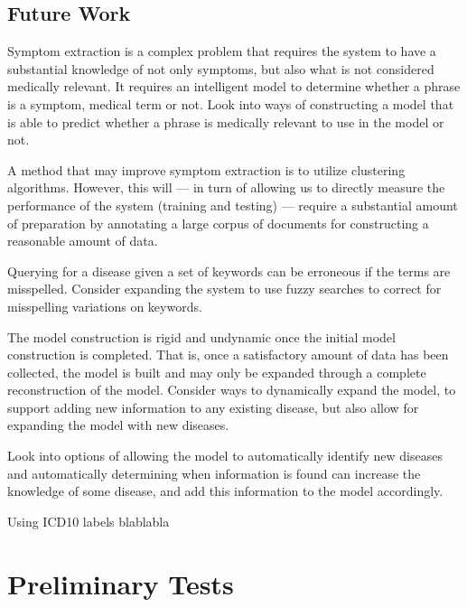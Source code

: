 \documentclass[10pt,letterpaper,final]{article}
\begin{document}




\subsection{Future Work}
Symptom extraction is a complex problem that requires the system to have
a substantial knowledge of not only symptoms, but also what is not
considered medically relevant. It requires an intelligent model to
determine whether a phrase is a symptom, medical term or not. Look into
ways of constructing a model that is able to predict whether a phrase
is medically relevant to use in the model or not.

A method that may improve symptom extraction is to utilize clustering
algorithms. However, this will --- in turn of allowing us to directly measure the
performance of the system (training and testing) --- require a substantial
amount of preparation by annotating a large corpus of documents for
constructing a reasonable amount of data.

Querying for a disease given a set of keywords can be erroneous if the
terms are misspelled. Consider expanding the system to use fuzzy
searches to correct for misspelling variations on keywords.

The model construction is rigid and undynamic once the initial model
construction is completed. That is, once a satisfactory amount of data
has been collected, the model is built and may only be expanded through
a complete reconstruction of the model. Consider ways to dynamically
expand the model, to support adding new information to any existing
disease, but also allow for expanding the model with new diseases.

Look into options of allowing the model to automatically identify new
diseases and automatically determining when information is found can
increase the knowledge of some disease, and add this information to the
model accordingly.

Using ICD10 labels   blablabla


\renewcommand\bibname{References}



\newpage
\appendix
\section{Preliminary Tests}
\label{app:preliminary_results}
\end{document}
